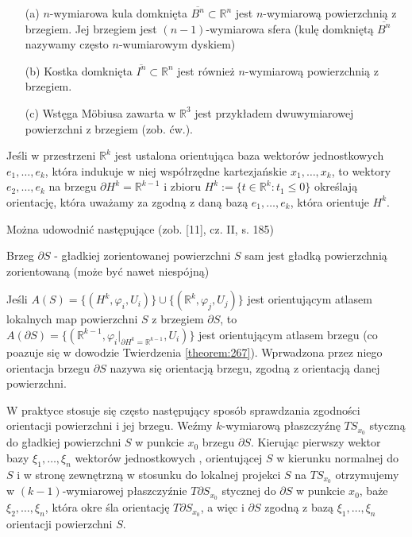 \documentclass[leqno]{article}
\begin{document}
\begin{justify}
\begin{ex}
    \begin{itemize}
        \item [(a)] $n$-wymiarowa kula domknięta $\overline{B^n} \subset \mathbb{R}^n$ jest $n$-wymiarową powierzchnią z brzegiem.
            Jej brzegiem jest $(n-1)$-wymiarowa sfera (kulę domkniętą $\overline{B^n}$ nazywamy często $n$-wumiarowym dyskiem)
        \item [(b)] Kostka domknięta $\overline{I^n} \subset \mathbb{R}^n$ jest również $n$-wymiarową powierzchnią z brzegiem.
        \item [(c)] Wstęga Möbiusa zawarta w $\mathbb{R}^3$ jest przykładem dwuwymiarowej powierzchni z brzegiem (zob. ćw.).
    \end{itemize}
\end{ex}

Jeśli w przestrzeni $\mathbb{R}^k$ jest ustalona orientująca baza wektorów jednostkowych $e_1, \ldots, e_k$, która indukuje w niej współrzędne kartezjańskie $x_1, \ldots, x_k$,
to wektory $e_2, \ldots, e_k$ na brzegu $\partial H^k = \mathbb{R}^{k-1}$ i zbioru $H^k := \{t \in \mathbb{R}^k : t_1 \leqslant 0\}$
określają orientację, która uważamy za zgodną z daną bazą $e_1, \ldots, e_k$, która orientuje $H^k$.

Można udowodnić następujące (zob. [11], cz. II, s. 185)

\begin{theorem}
{
    Brzeg $\partial S$ - gładkiej zorientowanej powierzchni $S$ sam jest gładką powierzchnią zorientowaną (może być nawet niespójną)
}
\end{theorem}

\begin{defn}
    Jeśli $A(S) = \{(H^k, \varphi_i, U_i)\} \cup \{(\mathbb{R}^k, \varphi_j, U_j)\}$ jest orientującym atlasem lokalnych map powierzchni $S$ z brzegiem $\partial S$,
    to \\
    $A(\partial S) = \{(\mathbb{R}^{k-1}, \varphi_i |_{\partial H^k = \mathbb{R}^{k-1}}, U_i)\}$ jest orientującym atlasem brzegu (co poazuje się w dowodzie 
    Twierdzenia \ref{theorem:267}). Wprwadzona przez niego orientacja brzegu $\partial S$ nazywa się orientacją brzegu, zgodną z orientacją danej powierzchni.
\end{defn}

\begin{uwaga}
    W praktyce stosuje się często następujący sposób sprawdzania zgodności orientacji powierzchni i jej brzegu. Weźmy $k$-wymiarową płaszczyźnę $TS_{x_0}$ 
    styczną do gładkiej powierzchni $S$ w punkcie $x_0$ brzegu $\partial S$. Kierując pierwszy wektor bazy $\xi_1, \ldots, \xi_n$ wektorów jednostkowych 
    , orientującej $S$ w kierunku normalnej do $S$ i w stronę zewnętrzną w stosunku do lokalnej projekci $S$ na $TS_{x_0}$ otrzymujemy w $(k-1)$-wymiarowej 
    płaszczyźnie $T\partial S_{x_0}$ stycznej do $\partial S$ w punkcie $x_0$, baże $\xi_2, \ldots, \xi_n$, która 
    okre śla orientację $T \partial S_{x_0}$, a więc i $\partial S$ zgodną z bazą $\xi_1, \ldots, \xi_n$ orientacji powierzchni $S$.
\end{uwaga}


\end{justify}
\end{document}
